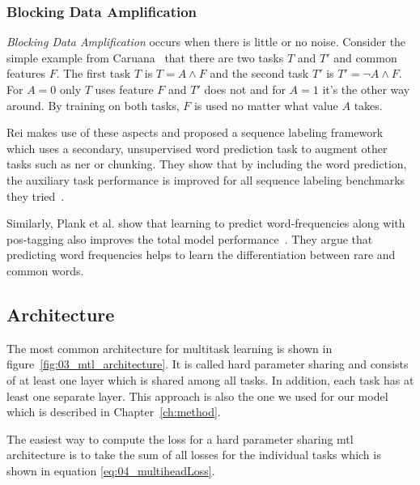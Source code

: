 \subsubsection*{Blocking Data Amplification}

\textit{Blocking Data Amplification} occurs when there is little or no noise. Consider the simple example from Caruana~\cite{Caruana1995a} that there are two tasks $T$ and $T'$ and common features $F$. The first task $T$ is $T = A \land F $ and the second task $T'$ is $T' = \neg A \land F$. For $A=0$ only $T$ uses feature $F$ and $T'$ does not and for $A=1$ it's the other way around. By training on both tasks, $F$ is used no matter what value $A$ takes. 

Rei makes use of these aspects and proposed a sequence labeling framework which uses a secondary, unsupervised word prediction task to augment other tasks such as \gls{ner} or chunking. They show that by including the word prediction, the auxiliary task performance is improved for all sequence labeling benchmarks they tried~\cite{Rei2017}.

Similarly, Plank et al. show that learning to predict word-frequencies along with \gls{pos}-tagging also improves the total model performance~\cite{Plank}. They argue that predicting word frequencies helps to learn the differentiation between rare and common words.


\subsection{Architecture}
The most common architecture for multitask learning is shown in figure~\ref{fig:03_mtl_architecture}. It is called hard parameter sharing and consists of at least one layer which is shared among all tasks. In addition, each task has at least one separate layer. This approach is also the one we used for our model which is described in Chapter~\ref{ch:method}. 

The easiest way to compute the loss for a hard parameter sharing \gls{mtl} architecture is to take the sum of all losses for the individual tasks which is shown in equation \ref{eq:04_multiheadLoss}.

